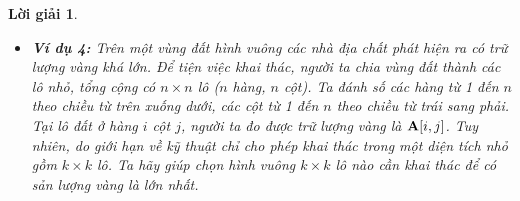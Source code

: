 \documentclass[14pt, a4paper]{article}
\theoremstyle{sltheorem}
\theoremstyle{soltheorem}
\newtheorem*{loigiai}{Lời giải}
\begin{document}
\begin{loigiai}
\begin{itemize} [label={$-$}]
        Ta có mã giả thuật toán:
    
        \begin{algorithm}
            \DontPrintSemicolon
    
             {
                $\bold{L} \lbrack i, i \rbrack \gets 0$\;
            }
             {
                 {
                    $j \gets i + l$\;
                    $\bold{L} \lbrack i, j \rbrack \gets \infty$\;
                     {
                        $val \gets \bold{L} \lbrack i, k \rbrack + \bold{L} \lbrack k + 1, j \rbrack + d_{i-1} d_{k} d_{j}$\;
                         {
                            $\bold{L} \lbrack i, j \rbrack \gets val$\;
                        }
                    }
                }
            }
            \;
            \caption{Thuật toán tính số phép tính nhỏ nhất thực hiện nhân chuỗi ma trận}
        \end{algorithm}
    
        Ta nhận thấy thuật toán có hai vòng lặp riêng rẽ, vòng lặp đầu tiên chỉ gồm 1 vòng lặp đơn có độ phức tạp tính toán $O(n)$,
        vòng lặp thứ hai gồm 3 vòng lặp lồng nhau có độ phức tạp tính toán $O(n^3)$. Ta cần lưu mảng $\bold{L}$ hai chiều như vậy độ phức tạp về bộ nhớ là $O(n^2)$.

        Code của thuật toán trên được trình bày ở phụ lục \ref{code-3-ex-1}
        
        \item \textbf{Ví dụ 4:} Trên một vùng đất hình vuông các nhà địa chất phát hiện ra có trữ lượng vàng khá lớn.
        Để tiện việc khai thác, người ta chia vùng đất thành các lô nhỏ, tổng cộng có $n \times n$ lô ($n$ hàng, $n$ cột).
        Ta đánh số các hàng từ 1 đến $n$ theo chiều từ trên xuống dưới,
        các cột từ 1 đến $n$ theo chiều từ trái sang phải. Tại lô đất ở hàng $i$ cột $j$,
        người ta đo được trữ lượng vàng là $\bold{A} \lbrack i, j \rbrack$.
        Tuy nhiên, do giới hạn về kỹ thuật chỉ cho phép khai thác trong một diện tích nhỏ gồm $k \times k$ lô.
        Ta hãy giúp chọn hình vuông $k \times k$ lô nào cần khai thác để có sản lượng vàng là lớn nhất.
        

\end{itemize}
\end{loigiai}
\end{document}
